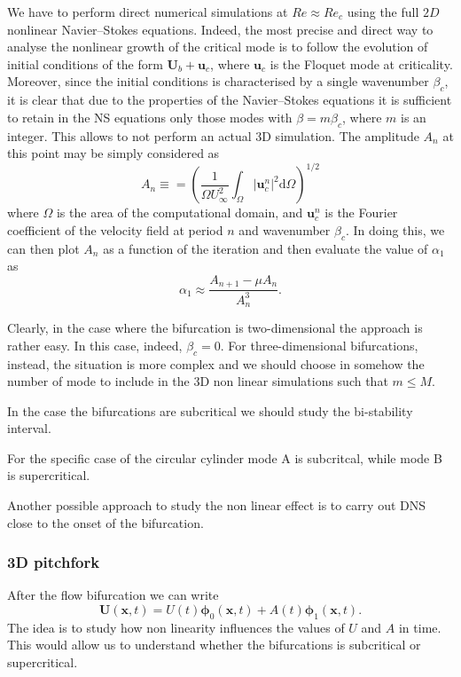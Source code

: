 We have to perform direct numerical simulations at $Re \approx Re_c$ using the full $2D$ nonlinear Navier--Stokes equations. Indeed, the most precise and direct way to analyse the nonlinear growth of the critical mode is to follow the evolution of initial conditions of the form $\bm{U}_b + \bm{u}_c$, where $\bm{u}_c$ is the Floquet mode at criticality. Moreover, since the initial conditions is characterised by a single wavenumber $\beta_c$, it is clear that due to the properties of the Navier--Stokes equations it is sufficient to retain in the NS equations only those modes with $\beta = m \beta_c$, where $m$ is an integer. This allows to not perform an actual 3D simulation.
The amplitude $A_n$ at this point may be simply considered as
%
\begin{equation}
  A_n \equiv =  \left( \frac{1}{\Omega U_\infty^2} \int_{\Omega} |\bm{u}^n_c|^2 \text{d} \Omega \right)^{1/2}
\end{equation}
%
where $\Omega$ is the area of the computational domain, and $\bm{u}^n_c$ is the Fourier coefficient of the velocity field at period $n$ and wavenumber $\beta_c$. In doing this, we can then plot $A_n$ as a function of the iteration and then evaluate the value of $\alpha_1$ as
%
\begin{equation}
  \alpha_1 \approx \frac{ A_{n+1} - \mu A_n}{A_n^3}.
\end{equation}
%

Clearly, in the case where the bifurcation is two-dimensional the approach is rather easy. In this case, indeed, $\beta_c = 0$. For three-dimensional bifurcations, instead, the situation is more complex and we should choose in somehow the number of mode to include in the 3D non linear simulations such that $m\le M$.

In the case the bifurcations are subcritical we should study the bi-stability interval.


For the specific case of the circular cylinder mode A is subcritcal, while mode B is supercritical.


Another possible approach to study the non linear effect is to carry out DNS close to the onset of the bifurcation.

\subsubsection{3D pitchfork}

After the flow bifurcation we can write
%
\begin{equation}
  \bm{U}(\bm{x},t) = U(t) \bm{\phi}_0(\bm{x},t) + A(t) \bm{\phi}_1(\bm{x},t).
\end{equation}
%
The idea is to study how non linearity influences the values of $U$ and $A$ in time. This would allow us to understand whether the bifurcations is subcritical or supercritical.

